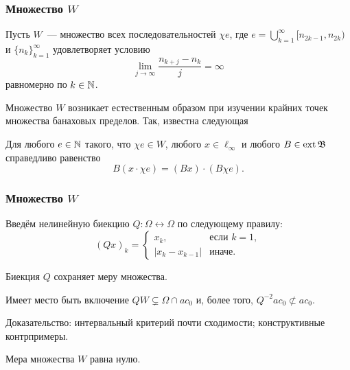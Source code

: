 \begin{frame}\frametitle{Множество $W$}


	Пусть $W$~--- множество всех последовательностей $\chi e$, где $e =\bigcup_{k=1}^{\infty} [n_{2k-1}, n_{2k} )$
	и $\{n_k \}_{k=1}^{\infty}$
	удовлетворяет условию
	\begin{equation}
		\label{eq:lim_j_n_kj_measure}
		\lim_{j\to\infty}\frac{n_{k+j} - n_k}{j} = \infty
	\end{equation}
	равномерно по $k \in \mathbb{N}$.

	Множество $W$ возникает естественным образом при изучении крайних точек множества банаховых пределов.
	Так, известна следующая
	\begin{llemma}
		Для любого $e\in\mathbb{N}$ такого, что $\chi e \in W$,
		любого $x\in\ell_\infty$
		и любого $B\in\operatorname{ext}\mathfrak{B}$
		справедливо равенство
		\begin{equation}
			B(x \cdot \chi e) = (Bx) \cdot (B\chi e)
			.
		\end{equation}
	\end{llemma}
\end{frame}




\begin{frame}\frametitle{Множество $W$}
	Введём нелинейную биекцию $Q:\Omega\leftrightarrow\Omega$ по следующему правилу:
	\begin{equation}
		(Qx)_k = \begin{cases}
			x_k, &\mbox{если~} k = 1,
			\\
			|x_k-x_{k-1}|&\mbox{иначе}.
		\end{cases}
	\end{equation}

	\begin{llemma}
		Биекция $Q$ сохраняет меру множества.
	\end{llemma}

	\begin{llemma}
		Имеет место быть включение $QW\subsetneq \Omega\cap ac_0$ и,
		более того,
		$Q^{-2} ac_0 \not \subset ac_0$.
	\end{llemma}

	Доказательство: интервальный критерий почти сходимости;
	конструктивные контрпримеры.


	\begin{ttheorem}
		Мера множества $W$ равна нулю.
	\end{ttheorem}


\end{frame}





